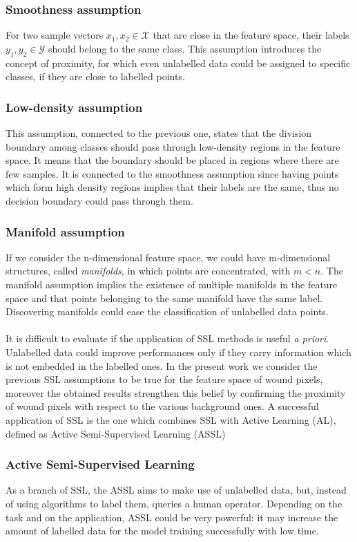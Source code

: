 \documentclass[../main.tex]{subfiles}
\begin{document}
\subsubsection{Smoothness assumption}

For two sample vectors $x_{1}, x_{2} \in \mathcal{X}$ that are close in the feature space, their labels  $y_{1}, y_{2} \in \mathcal{Y}$ should belong to the same class. 
This assumption introduces the concept of proximity, for which even unlabelled data could be assigned to specific classes, if they are close to labelled points.

\subsubsection{Low-density assumption}

This assumption, connected to the previous one, states that the division boundary among classes should pass through low-density regions in the feature space. 
It means that the boundary should be placed in regions where there are few samples.
It is connected to the smoothness assumption since having points which form high density regions implies that their labels are the same, thus no decision boundary could pass through them.

\subsubsection{Manifold assumption}

If we consider the n-dimensional feature space, we could have m-dimensional structures, called \textit{manifolds}, in which points are concentrated, with $m<n$.
The manifold assumption implies the existence of multiple manifolds in the feature space and that points belonging to the same manifold have the same label.
Discovering manifolds could ease the classification of unlabelled data points.\\
\\
It is difficult to evaluate if the application of SSL methods is useful \textit{a priori}. Unlabelled data could improve performances only if they carry information which is not embedded in the labelled ones.
In the present work we consider the previous SSL assumptions to be true for the feature space of wound pixels, moreover the obtained results strengthen this belief by confirming the proximity of wound pixels with respect to the various background ones.
A successful application of SSL is the one which combines SSL with Active Learning (AL), defined as Active Semi-Supervised Learning (ASSL)
\subsubsection{Active Semi-Supervised Learning}

As a branch of SSL, the ASSL aims to make use of unlabelled data, but, instead of using algorithms to label them, queries a human operator. Depending on the task and on the application, ASSL could be very powerful: it may increase the amount of labelled data for the model training successfully with low time.
\end{document}
